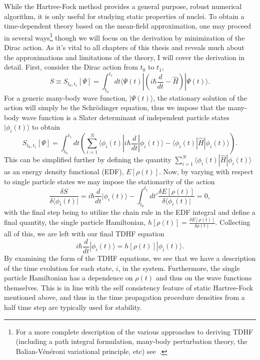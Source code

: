 While the Hartree-Fock method provides a general purpose, robust numerical algorithm, it is only useful for studying static properties of nuclei.
To obtain a time-dependent theory based on the mean-field approximation, one may proceed in several ways\footnote{For a more complete description of the various approaches to deriving TDHF (including a path integral formulation, many-body perturbation theory, the Balian-V\'en\'eroni variational principle, etc) see~\citep{simenel2018}.} though we will focus on the derivation by minimization of the Dirac action.
As it's vital to all chapters of this thesis and reveals much about the approximations and limitations of the theory, I will cover the derivation in detail.
First, consider the Dirac action from $t_0$ to $t_1$,
\begin{equation}
S\equiv S_{t_0,t_1}[\Psi] = \int_{t_0}^{t_1}dt \langle \Psi(t) | \left(i\hbar\frac{d}{dt}-\hat{H}\right)|\Psi(t)\rangle.
\end{equation}
For a generic many-body wave function, $|\Psi(t)\rangle$, the stationary solution of the action will simply be the Schr\"odinger equation, thus we impose that the many-body wave function is a Slater determinant of independent particle states $|\phi_i(t)\rangle$ to obtain
\begin{equation}
S_{t_0,t_1}[\Psi] = \int_{t_0}^{t_1}dt \left(\sum_{i=1}^{N} \langle\phi_i(t)|i\hbar\frac{d}{dt}|\phi_i(t)\rangle-\langle\phi_i(t)|\hat{H}|\phi_i(t)\rangle\right).
\end{equation}
This can be simplified further by defining the quantity $\sum_{i=1}^{N}\langle\phi_i(t)|\hat{H}|\phi_i(t)\rangle$ as an energy density functional (EDF), $E[\rho(t)]$.
Now, by varying with respect to single particle states we may impose the stationarity of the action
\begin{equation}
\frac{\delta S}{\delta\langle\phi_i(t)|}=i\hbar\frac{d}{dt}|\phi_i(t)\rangle - \int_{t_0}^{t_1}dt' \frac{\delta E[\rho(t)]}{\delta\langle\phi_i(t)|} = 0,
\end{equation}
with the final step being to utilize the chain rule in the EDF integral and define a final quantity, the single particle Hamiltonian, $h[\rho(t)]=\frac{\delta E[\rho(t)]}{\delta\rho(t)}$.
Collecting all of this, we are left with our final TDHF equation
\begin{equation}
i\hbar\frac{d}{dt}|\phi_i(t)\rangle = h[\rho(t)]|\phi_i(t)\rangle.
\label{eq:tdhf}
\end{equation}
By examining the form of the TDHF equations, we see that we have a description of the time evolution for each state, $i$, in the system.
Furthermore, the single particle Hamiltonian has a dependence on $\rho(t)$ and thus on the wave functions themselves.
This is in line with the self consistency feature of static Hartree-Fock mentioned above, and thus in the time propagation procedure densities from a half time step are typically used for stability.

